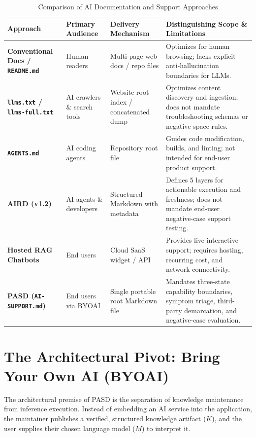 \documentclass[12pt, a4paper]{article}
\begin{document}
\begin{table}[htbp]
\centering
\caption{Comparison of AI Documentation and Support Approaches}
\label{tab:prior_art}
\footnotesize
\renewcommand{\arraystretch}{1.25}
\begin{tabularx}{\textwidth}{@{}p{} p{} p{} >{\raggedright\arraybackslash}X@{}}
\toprule
\textbf{Approach} & \textbf{Primary Audience} & \textbf{Delivery Mechanism} & \textbf{Distinguishing Scope \& Limitations} \\
\midrule
\textbf{Conventional Docs / \texttt{README.md}} & Human readers & Multi-page web docs / repo files & Optimizes for human browsing; lacks explicit anti-hallucination boundaries for LLMs. \\
\textbf{\texttt{llms.txt} / \texttt{llms-full.txt}} & AI crawlers \& search tools & Website root index / concatenated dump & Optimizes content discovery and ingestion; does not mandate troubleshooting schemas or negative space rules. \\
\textbf{\texttt{AGENTS.md}} & AI coding agents & Repository root file & Guides code modification, builds, and linting; not intended for end-user product support. \\
\textbf{AIRD (v1.2)} & AI agents \& developers & Structured Markdown with metadata & Defines 5 layers for actionable execution and freshness; does not mandate end-user negative-case support testing. \\
\textbf{Hosted RAG Chatbots} & End users & Cloud SaaS widget / API & Provides live interactive support; requires hosting, recurring cost, and network connectivity. \\
\textbf{PASD (\texttt{AI-SUPPORT.md})} & End users via BYOAI & Single portable root Markdown file & Mandates three-state capability boundaries, symptom triage, third-party demarcation, and negative-case evaluation. \\
\bottomrule
\end{tabularx}
\end{table}


\section{The Architectural Pivot: Bring Your Own AI (BYOAI)}
\label{sec:pivot}

The architectural premise of PASD is the separation of knowledge maintenance from inference execution. Instead of embedding an AI service into the application, the maintainer publishes a verified, structured knowledge artifact ($K$), and the user supplies their chosen language model ($M$) to interpret it.
\end{document}
